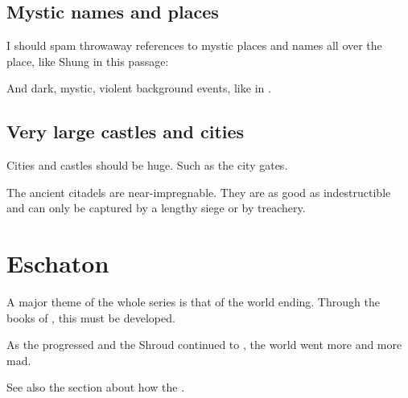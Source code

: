\subsection{Mystic names and places}
I should spam throwaway references to mystic places and names all over the place, like Shung in this passage:


And dark, mystic, violent background events, like in .









\subsection{Very large castles and cities}
Cities and castles should be huge. Such as the {\Malcuric city gates}.

The ancient citadels are near-impregnable. They are as good as indestructible and can only be captured by a lengthy siege or by treachery.















\section{Eschaton}
A major theme of the whole series is that of the world ending. 
Through the books of \SentinelsofMithEmph, this must be developed. 

As the \thirdbanewar progressed and the Shroud continued to , the world went more and more mad. 

See also the section about how the . 

